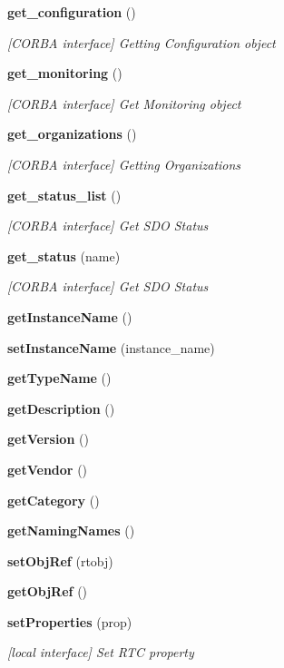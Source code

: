 \begin{CompactItemize}
{\bf get\_\-configuration} ()
\begin{CompactList}\small\item\em [CORBA interface] Getting Configuration object \item\end{CompactList}\item 
{\bf get\_\-monitoring} ()
\begin{CompactList}\small\item\em [CORBA interface] Get Monitoring object \item\end{CompactList}\item 
{\bf get\_\-organizations} ()
\begin{CompactList}\small\item\em [CORBA interface] Getting Organizations \item\end{CompactList}\item 
{\bf get\_\-status\_\-list} ()
\begin{CompactList}\small\item\em [CORBA interface] Get SDO Status \item\end{CompactList}\item 
{\bf get\_\-status} (name)
\begin{CompactList}\small\item\em [CORBA interface] Get SDO Status \item\end{CompactList}\item 
{\bf get\-Instance\-Name} ()
\item 
{\bf set\-Instance\-Name} (instance\_\-name)
\item 
{\bf get\-Type\-Name} ()
\item 
{\bf get\-Description} ()
\item 
{\bf get\-Version} ()
\item 
{\bf get\-Vendor} ()
\item 
{\bf get\-Category} ()
\item 
{\bf get\-Naming\-Names} ()
\item 
{\bf set\-Obj\-Ref} (rtobj)
\item 
{\bf get\-Obj\-Ref} ()
\item 
{\bf set\-Properties} (prop)
\begin{CompactList}\small\item\em [local interface] Set RTC property \item\end{CompactList}\item 

\end{CompactItemize}
